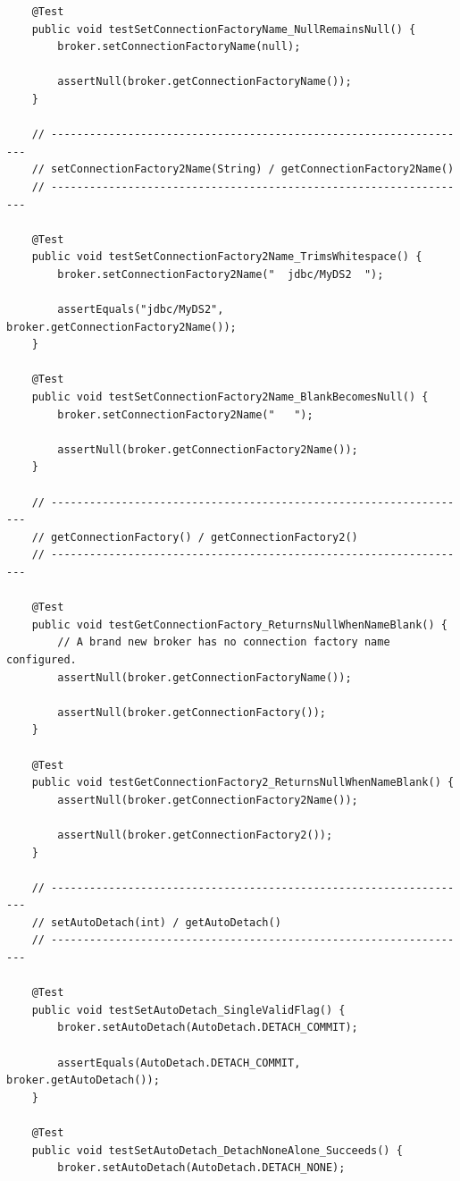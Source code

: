 \begin{lstlisting}
    @Test
    public void testSetConnectionFactoryName_NullRemainsNull() {
        broker.setConnectionFactoryName(null);

        assertNull(broker.getConnectionFactoryName());
    }

    // ------------------------------------------------------------------
    // setConnectionFactory2Name(String) / getConnectionFactory2Name()
    // ------------------------------------------------------------------

    @Test
    public void testSetConnectionFactory2Name_TrimsWhitespace() {
        broker.setConnectionFactory2Name("  jdbc/MyDS2  ");

        assertEquals("jdbc/MyDS2", broker.getConnectionFactory2Name());
    }

    @Test
    public void testSetConnectionFactory2Name_BlankBecomesNull() {
        broker.setConnectionFactory2Name("   ");

        assertNull(broker.getConnectionFactory2Name());
    }

    // ------------------------------------------------------------------
    // getConnectionFactory() / getConnectionFactory2()
    // ------------------------------------------------------------------

    @Test
    public void testGetConnectionFactory_ReturnsNullWhenNameBlank() {
        // A brand new broker has no connection factory name configured.
        assertNull(broker.getConnectionFactoryName());

        assertNull(broker.getConnectionFactory());
    }

    @Test
    public void testGetConnectionFactory2_ReturnsNullWhenNameBlank() {
        assertNull(broker.getConnectionFactory2Name());

        assertNull(broker.getConnectionFactory2());
    }

    // ------------------------------------------------------------------
    // setAutoDetach(int) / getAutoDetach()
    // ------------------------------------------------------------------

    @Test
    public void testSetAutoDetach_SingleValidFlag() {
        broker.setAutoDetach(AutoDetach.DETACH_COMMIT);

        assertEquals(AutoDetach.DETACH_COMMIT, broker.getAutoDetach());
    }

    @Test
    public void testSetAutoDetach_DetachNoneAlone_Succeeds() {
        broker.setAutoDetach(AutoDetach.DETACH_NONE);


\end{lstlisting}
